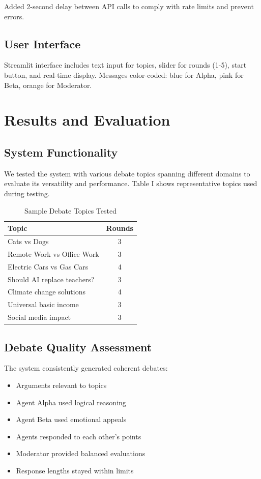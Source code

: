 \documentclass[conference]{IEEEtran}
\begin{document}
Added 2-second delay between API calls to comply with rate limits and prevent errors.

\subsection{User Interface}

Streamlit interface includes text input for topics, slider for rounds (1-5), start button, and real-time display. Messages color-coded: blue for Alpha, pink for Beta, orange for Moderator.

\section{Results and Evaluation}

\subsection{System Functionality}

We tested the system with various debate topics spanning different domains to evaluate its versatility and performance. Table I shows representative topics used during testing.

\begin{table}[htbp]
\caption{Sample Debate Topics Tested}
\begin{center}
\begin{tabular}{|l|c|}
\hline
\textbf{Topic} & \textbf{Rounds} \\
\hline
Cats vs Dogs & 3 \\
Remote Work vs Office Work & 3 \\
Electric Cars vs Gas Cars & 4 \\
Should AI replace teachers? & 3 \\
Climate change solutions & 4 \\
Universal basic income & 3 \\
Social media impact & 3 \\
\hline
\end{tabular}
\end{center}
\label{tab:topics}
\end{table}

\subsection{Debate Quality Assessment}

The system consistently generated coherent debates:
\begin{itemize}
\item Arguments relevant to topics
\item Agent Alpha used logical reasoning
\item Agent Beta used emotional appeals
\item Agents responded to each other's points
\item Moderator provided balanced evaluations
\item Response lengths stayed within limits
\end{itemize}
\end{document}
